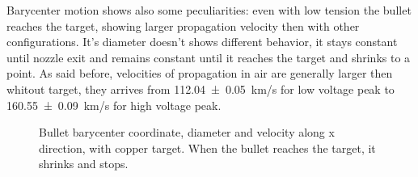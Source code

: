 Barycenter motion shows also some peculiarities: even with low tension the bullet reaches the target, showing larger propagation velocity then with other configurations. It's diameter doesn't shows different behavior, it stays constant until nozzle exit and remains constant until it reaches the target and shrinks to a point. As said before, velocities of propagation in air are generally larger then whitout target, they arrives from \SI{112.04(5)}{\kilo\meter/\second} for low voltage peak to \SI{160.55(9)}{\kilo\meter/\second} for high voltage peak.
\begin{figure}
 \centering
 \hfill
 \caption{Bullet barycenter coordinate, diameter and velocity along x direction, with copper target. When the bullet reaches the target, it shrinks and stops.}
 \label{fig:elio_a_xb}
\end{figure}


